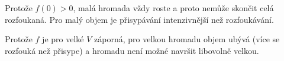 Protože $f(0)>0$, malá hromada vždy roste a proto nemůže skončit celá rozfoukaná. Pro malý objem je přisypávání intenzivnější než rozfoukávání.

Protože $f$ je pro velké $V$ záporná, pro velkou hromadu objem ubývá (více se rozfouká než přisype) a hromadu není možné navršit libovolně velkou. 

\konec


\stranka







